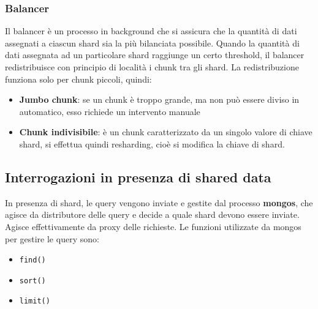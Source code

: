 \documentclass[a4paper]{article}
\begin{document}
\subsubsection{Balancer}
Il balancer è un processo in background che si assicura che la quantità di dati
assegnati a ciascun shard sia la più bilanciata possibile. Quando la quantità di dati
assegnata ad un particolare shard raggiunge un certo threshold, il balancer 
redistribuisce con principio di località i chunk tra gli shard. La redistribuzione
funziona solo per chunk piccoli, quindi:
\begin{itemize}
  \item \textbf{Jumbo chunk}: se un chunk è troppo grande, ma non può essere diviso
    in automatico, esso richiede un intervento manuale
  \item \textbf{Chunk indivisibile}: è un chunk caratterizzato da un singolo
    valore di chiave shard, si effettua quindi resharding, cioè si modifica la chiave
    di shard.
\end{itemize}

\subsection{Interrogazioni in presenza di shared data}
In presenza di shard, le query vengono inviate e gestite dal processo \textbf{mongos},
che agisce da distributore delle query e decide a quale shard devono essere inviate.
Agisce effettivamente da proxy delle richieste. Le funzioni utilizzate da mongos
per gestire le query sono:
\begin{itemize}
  \item \texttt{find()}
  \item \texttt{sort()}
  \item \texttt{limit()}
\end{itemize}
\end{document}
